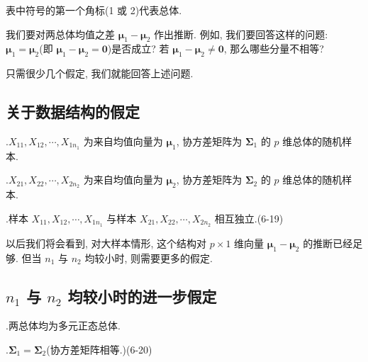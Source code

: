 表中符号的第一个角标(1 或 2)代表总体.

我们要对两总体均值之差 $\boldsymbol{\mu}_{1}-\boldsymbol{\mu}_{2}$ 作出推断. 例如, 我们要回答这样的问题: $\boldsymbol{\mu}_{1}=\boldsymbol{\mu}_{2}$(即 $\boldsymbol{\mu}_{1}-\boldsymbol{\mu}_{2}=\mathbf{0}$)是否成立? 若 $\boldsymbol{\mu}_{1}-\boldsymbol{\mu}_{2}\neq\mathbf{0}$, 那么哪些分量不相等?

只需很少几个假定, 我们就能回答上述问题.

\subsection{关于数据结构的假定}

.\quad $X_{11},X_{12},\cdots,X_{1n_{1}}$ 为来自均值向量为 $\boldsymbol{\mu}_{1}$, 协方差矩阵为 $\boldsymbol{\Sigma}_{1}$ 的 $p$ 维总体的随机样本.

.\quad $X_{21},X_{22},\cdots,X_{2n_{2}}$ 为来自均值向量为 $\boldsymbol{\mu}_{2}$, 协方差矩阵为 $\boldsymbol{\Sigma}_{2}$ 的 $p$ 维总体的随机样本.

.\quad 样本 $X_{11},X_{12},\cdots,X_{1n_{1}}$ 与样本 $X_{21},X_{22},\cdots,X_{2n_{2}}$ 相互独立.\hfill(6-19)

以后我们将会看到, 对大样本情形, 这个结构对 $p\times 1$ 维向量 $\boldsymbol{\mu}_{1}-\boldsymbol{\mu}_{2}$ 的推断已经足够. 但当 $n_{1}$ 与 $n_{2}$ 均较小时, 则需要更多的假定.

\subsection{$n_{1}$ 与 $n_{2}$ 均较小时的进一步假定}

.\quad 两总体均为多元正态总体.

.\quad $\boldsymbol{\Sigma}_{1}=\boldsymbol{\Sigma}_{2}$(协方差矩阵相等.)\hfill(6-20)
